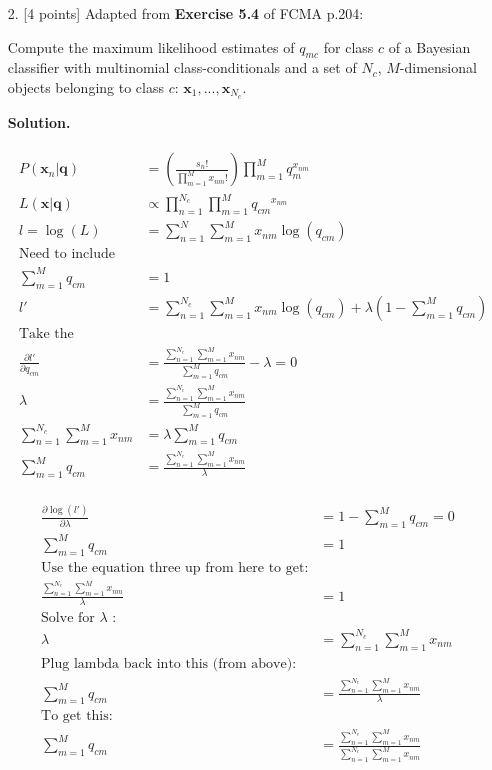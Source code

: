 \documentclass[10pt]{article}
\begin{document}
\begin{itemize}
\item[2.]  [4 points]
Adapted from {\bf Exercise 5.4} of FCMA p.204:

Compute the maximum likelihood estimates of $q_{mc}$ for class $c$ of a Bayesian classifier with multinomial class-conditionals and a set of $N_c$, $M$-dimensional objects belonging to class $c$: $\mathbf{x}_1, ..., \mathbf{x}_{N_c}$.

{\bf Solution.} %

\begin{eqnarray*}
\begin{aligned}
P(\mathbf{x}_n | \mathbf{q}) &= \left( \frac{s_n !}{\prod_{m=1}^M x_{nm} !} \right)
\prod_{m=1}^M q_{m}^{x_{nm}}
\\
L(\mathbf{x}| \mathbf{q}) &\propto \prod_{n=1}^{N_c} \prod_{m=1}^M {q_{cm}}^{x_{nm}}
\\
l = \log(L) &= \sum_{n=1}^N \sum_{m=1}^M x_{nm} \log(q_{cm})
\\
\text{Need to include constraint, Lagrange multiplier}
\\
\sum_{m=1}^M q_{cm} &= 1
\\
l' &= \sum_{n=1}^{N_c} \sum_{m=1}^M x_{nm} \log(q_{cm}) + \lambda(1 - \sum_{m=1}^M q_{cm})
\\
\text{Take the derivative, set to 0}
\\
\frac{\partial l'}{\partial q_{cm}} &= 
\frac{ \sum_{n=1}^{N_c} \sum_{m=1}^M x_{nm} }{ \sum_{m=1}^M q_{cm}} - \lambda = 0
\\
\lambda &= \frac{ \sum_{n=1}^{N_c} \sum_{m=1}^M x_{nm} }{\sum_{m=1}^M q_{cm}}
\\
\sum_{n=1}^{N_c} \sum_{m=1}^M x_{nm} &= \lambda \sum_{m=1}^M q_{cm}
\\
\sum_{m=1}^M q_{cm} &= \frac{ \sum_{n=1}^{N_c} \sum_{m=1}^M x_{nm} }{ \lambda }
\end{aligned}
\end{eqnarray*}

\begin{eqnarray*}
\begin{aligned}
\frac{\partial \log(l')}{\partial \lambda} &= 
1 - \sum_{m=1}^M q_{cm} = 0
\\
\sum_{m=1}^M q_{cm} &= 1 
\\
\text{Use the equation three up from here to get:}
\\
\frac{ \sum_{n=1}^{N_c} \sum_{m=1}^M x_{nm} }{ \lambda } &= 1
\\
\text{Solve for $\lambda$ :}
\\
\lambda &= \sum_{n=1}^{N_c} \sum_{m=1}^M x_{nm}
\\
\text{Plug lambda back into this (from above):}
\\
\sum_{m=1}^M q_{cm} &= \frac{ \sum_{n=1}^{N_c} \sum_{m=1}^M x_{nm} }{ \lambda }
\\
\text{To get this:}
\\
\sum_{m=1}^M q_{cm} &= \frac{ \sum_{n=1}^{N_c} \sum_{m=1}^M x_{nm} }{ \sum_{n=1}^{N_c} \sum_{m=1}^M x_{nm} }
\end{aligned}
\end{eqnarray*}


\end{itemize}
\end{document}

